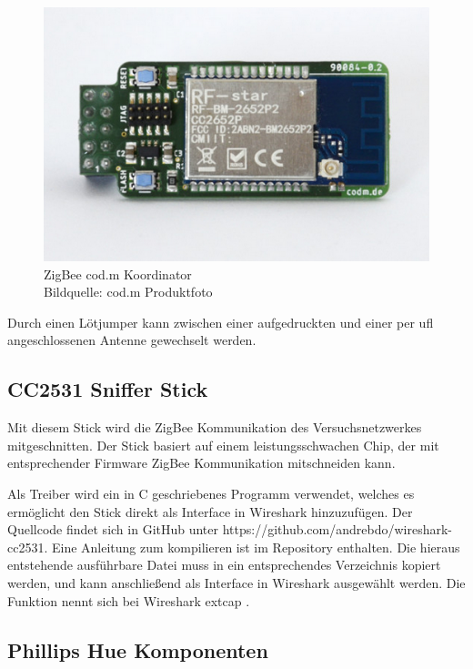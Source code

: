 \begin{figure}[H]
  \centering
  \includegraphics[width=1\textwidth]{media/codm.png}
  \caption{ZigBee cod.m Koordinator \\ Bildquelle: cod.m Produktfoto}
\end{figure}

Durch einen Lötjumper kann zwischen einer aufgedruckten und einer per \grqq ufl\grqq{} angeschlossenen Antenne gewechselt werden.

\subsection{CC2531 Sniffer Stick}

Mit diesem Stick wird die ZigBee Kommunikation des Versuchsnetzwerkes mitgeschnitten.
Der Stick basiert auf einem leistungsschwachen Chip, der mit entsprechender Firmware ZigBee Kommunikation mitschneiden kann. 

Als Treiber wird ein in C geschriebenes Programm verwendet, welches es ermöglicht den Stick direkt als Interface in Wireshark hinzuzufügen. Der Quellcode findet sich in 
GitHub unter https://github.com/andrebdo/wireshark-cc2531. Eine Anleitung zum kompilieren ist im Repository enthalten. Die hieraus entstehende ausführbare Datei muss in ein
entsprechendes Verzeichnis kopiert werden, und kann anschließend als Interface in Wireshark ausgewählt werden. Die Funktion nennt sich bei Wireshark \grqq extcap \grqq{}.

\subsection{Phillips Hue Komponenten}

